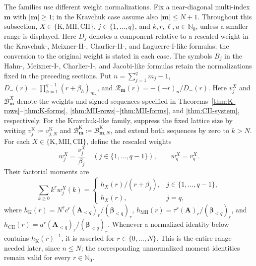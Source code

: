 \documentclass[10pt]{amsart}
\newcommand{\Nzero}{\mathbb N_0}
\newcommand{\A}{\boldsymbol A}
\newcommand{\bbeta}{\boldsymbol\beta}
\newcommand{\mm}{\boldsymbol m}
\newcommand{\abs}[1]{\lvert#1\rvert}
\newcommand{\fall}[2]{#1^{\underline{#2}}}
\theoremstyle{plain}
\theoremstyle{definition}
\theoremstyle{remark}
\begin{document}
The families use different weight normalizations. Fix a near-diagonal
multi-index \(\mm\) with \(\abs\mm\ge1\); in the Kravchuk case assume
also \(\abs\mm\le N+1\). Throughout this subsection,
\(X\in\{\mathrm K,\mathrm{MII},\mathrm{CII}\}\),
\(j\in\{1,\ldots,q\}\), and \(k,r,\ell,u\in\Nzero\), unless a smaller
range is displayed. Here
\(D_j\) denotes a component relative to a rescaled weight in the
Kravchuk-, Meixner-II-, Charlier-II-, and Laguerre-I-like formulas; the
conversion to the original weight is stated in each case. The symbols
\(B_j\) in the Hahn-, Meixner-I-, Charlier-I-, and Jacobi-like formulas
retain the normalizations fixed in the preceding sections. Put
\(n=\sum_{j=1}^q m_j-1\),
\(D_-(r)=\prod_{h=1}^{q-1}(r+\beta_h)_{m_h}\), and
\(\mathcal R_{\mm}(r)=-(-r)_n/D_-(r)\).
Here \(v_j^X\) and \(\mathcal B_{\mm}^X\) denote the weights and signed
sequences specified in Theorems~\ref{thm:K-rows}--\ref{thm:K-forms},
\ref{thm:MII-rows}--\ref{thm:MII-forms}, and
\ref{thm:CII-system}, respectively. For the
Kravchuk-like family, suppress the fixed lattice size by writing
\(v_j^{\mathrm K}\coloneq v_{j,N}^{\mathrm K}\) and
\(\mathcal B_{\mm}^{\mathrm K}\coloneq\mathcal B_{\mm,N}^{\mathrm K}\), and
extend both sequences by zero to \(k>N\).
For each \(X\in\{\mathrm K,\mathrm{MII},\mathrm{CII}\}\), define the
rescaled weights
\begin{equation}
 w_j^X=\frac{v_j^X}{\beta_j}\quad
 (j\in\{1,\ldots,q-1\}),
 \qquad w_q^X=v_q^X.
 \label{eq:unreflected-canonical-rows}
\end{equation}
Their factorial moments are
\begin{equation}
 \sum_{k\ge0}\fall{k}{r}w_j^X(k)=
 \begin{cases}
 h_X(r)/(r+\beta_j),&j\in\{1,\ldots,q-1\},\\
 h_X(r),&j=q,
 \end{cases}
 \label{eq:unreflected-canonical-moments}
\end{equation}
where
\(h_{\mathrm K}(r)=\fall{N}{r}c^r(\A_{<q})_r/(\bbeta_{<q})_r\),
\(h_{\mathrm{MII}}(r)=\tau^r(\A)_r/(\bbeta_{<q})_r\), and
\(h_{\mathrm{CII}}(r)=a^r(\A_{<q})_r/(\bbeta_{<q})_r\).
Whenever a normalized identity below contains \(h_{\mathrm K}(r)^{-1}\),
it is asserted for \(r\in\{0,\ldots,N\}\). This is the entire range needed
later, since \(n\le N\); the corresponding unnormalized moment identities
remain valid for every \(r\in\Nzero\).
\end{document}
